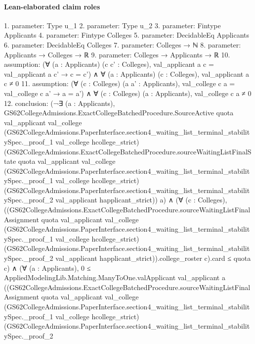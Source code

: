 \documentclass[10pt]{article}
\begin{document}
\paragraph{Lean-elaborated claim roles}\begin{ReviewVerbatim}
1. parameter: Type u_1
2. parameter: Type u_2
3. parameter: Fintype Applicants
4. parameter: Fintype Colleges
5. parameter: DecidableEq Applicants
6. parameter: DecidableEq Colleges
7. parameter: Colleges → ℕ
8. parameter: Applicants → Colleges → ℝ
9. parameter: Colleges → Applicants → ℝ
10. assumption: (∀ (a : Applicants) (c c' : Colleges), val_applicant a c = val_applicant a c' → c = c') ∧
  ∀ (a : Applicants) (c : Colleges), val_applicant a c ≠ 0
11. assumption: (∀ (c : Colleges) (a a' : Applicants), val_college c a = val_college c a' → a = a') ∧
  ∀ (c : Colleges) (a : Applicants), val_college c a ≠ 0
12. conclusion: (¬∃ (a : Applicants),
      GS62CollegeAdmissions.ExactCollegeBatchedProcedure.SourceActive quota val_applicant val_college
        (GS62CollegeAdmissions.PaperInterface.section4_waiting_list_terminal_stabilitySpec._proof_1 val_college
          hcollege_strict)
        (GS62CollegeAdmissions.ExactCollegeBatchedProcedure.sourceWaitingListFinalState quota val_applicant val_college
          (GS62CollegeAdmissions.PaperInterface.section4_waiting_list_terminal_stabilitySpec._proof_1 val_college
            hcollege_strict)
          (GS62CollegeAdmissions.PaperInterface.section4_waiting_list_terminal_stabilitySpec._proof_2 val_applicant
            happlicant_strict))
        a) ∧
  (∀ (c : Colleges),
      ((GS62CollegeAdmissions.ExactCollegeBatchedProcedure.sourceWaitingListFinalAssignment quota val_applicant
                val_college
                (GS62CollegeAdmissions.PaperInterface.section4_waiting_list_terminal_stabilitySpec._proof_1 val_college
                  hcollege_strict)
                (GS62CollegeAdmissions.PaperInterface.section4_waiting_list_terminal_stabilitySpec._proof_2
                  val_applicant happlicant_strict)).college_roster
            c).card ≤
        quota c) ∧
    (∀ (a : Applicants),
        0 ≤
          AppliedModelingLib.Matching.ManyToOne.valApplicant val_applicant a
            ((GS62CollegeAdmissions.ExactCollegeBatchedProcedure.sourceWaitingListFinalAssignment quota val_applicant
                  val_college
                  (GS62CollegeAdmissions.PaperInterface.section4_waiting_list_terminal_stabilitySpec._proof_1
                    val_college hcollege_strict)
                  (GS62CollegeAdmissions.PaperInterface.section4_waiting_list_terminal_stabilitySpec._proof_2

\end{ReviewVerbatim}
\end{document}
